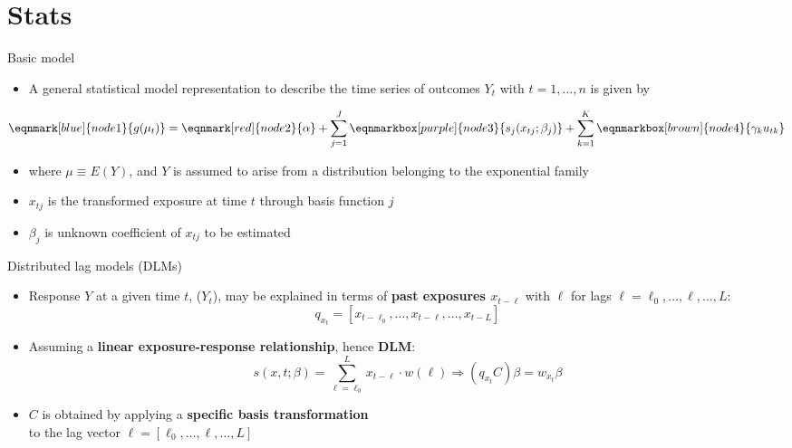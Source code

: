 \documentclass[english]{beamer}
\newcommand{\alertblue}[1]{{\color{blue}#1}}
\begin{document}
\section{Stats}
\begin{frame}{Basic model}
\begin{itemize}
    \item A general statistical model representation to describe the \alertblue{time series of outcomes \( Y_t \)} with \alertblue{\( t = 1, \dots, n \)} is given by
\end{itemize}
\vspace{0.8cm}
\begin{equation*}
    \eqnmark[blue]{node1}{g(\mu_t)} =
    \eqnmark[red]{node2}{\alpha} +
    \sum_{j=1}^{J} \eqnmarkbox[purple]{node3}{s_j(x_{tj}; \beta_j)} +
    \sum_{k=1}^{K} \eqnmarkbox[brown]{node4}{\gamma_k u_{tk}}
\end{equation*}
\vspace{0.5cm}
\begin{itemize}
    \item where \alertblue{\( \mu \equiv E(Y) \)}, and \( Y \) is assumed to arise from a distribution belonging to the exponential family  
    \item \alertblue{\(x_{tj}\)} is the transformed exposure at time \alertblue{\(t\)} through basis function \alertblue{\(j\)}
    \item \alertblue{\(\beta_j\)} is unknown coefficient of \alertblue{\(x_{tj}\)} to be estimated
\end{itemize}
\end{frame}
\begin{frame}{Distributed lag models (DLMs)}
\begin{itemize}
    \item Response \alertblue{\(Y\)} at a given time \alertblue{\(t\)}, (\alertblue{\(Y_t\)}),  may be explained in terms of \textbf{\alertblue{past exposures \( x_{t-\ell} \)}} with \(\ell\) for lags \( \ell = \ell_0, \ldots, \ell, \ldots, L \):
    \[q_{x_t} = [x_{t - \ell_0}, \ldots, x_{t - \ell}, \ldots, x_{t - L}]\]

    \item Assuming a \textbf{\alertblue{linear exposure-response relationship}}, hence \textbf{\alertblue{DLM}}:
    \[s(x,t; \beta) =\sum_{\ell = \ell_0}^{L} x_{t-\ell} \cdot w( \ell)
        \Rightarrow (q_{x_t} C) \beta = w_{x_t} \beta\] 

    \item \textbf{\alertblue{\( C \)}} is obtained by applying a \textbf{\alertblue{specific basis transformation}} \\
    to the lag vector \( \ell = [\ell_0, \ldots, \ell, \ldots, L] \) 
\end{itemize}
\end{frame}
\end{document}
